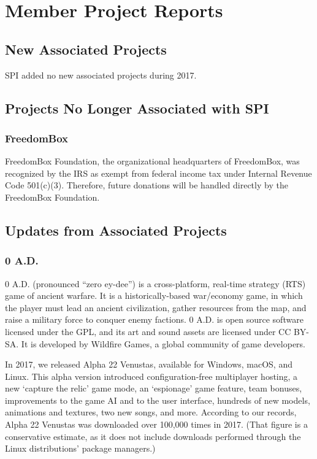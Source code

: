 \documentclass[a4paper]{report}
\begin{document}
\chapter{Member Project Reports}

\section{New Associated Projects}

SPI added no new associated projects during 2017.

\section{Projects No Longer Associated with SPI}

\subsection{FreedomBox}

FreedomBox Foundation, the organizational headquarters of FreedomBox,
was recognized by the IRS as exempt from federal income tax under
Internal Revenue Code 501(c)(3).  Therefore, future donations will
be handled directly by the FreedomBox Foundation.

\section{Updates from Associated Projects}

\subsection{0 A.D.}

0 A.D. (pronounced ``zero ey-dee'') is a cross-platform, real-time
strategy (RTS) game of ancient warfare. It is a historically-based
war/economy game, in which the player must lead an ancient civilization,
gather resources from the map, and raise a military force to conquer
enemy factions. 0 A.D. is open source software licensed under the GPL,
and its art and sound assets are licensed under CC BY-SA. It is
developed by Wildfire Games, a global community of game developers.

In 2017, we released Alpha 22 Venustas, available for Windows, macOS,
and Linux. This alpha version introduced configuration-free multiplayer
hosting, a new `capture the relic' game mode, an `espionage' game
feature, team bonuses, improvements to the game AI and to the user
interface, hundreds of new models, animations and textures, two new
songs, and more.  According to our records, Alpha 22 Venustas was
downloaded over 100,000 times in 2017. (That figure is a conservative
estimate, as it does not include downloads performed through the Linux
distributions' package managers.)
\end{document}
